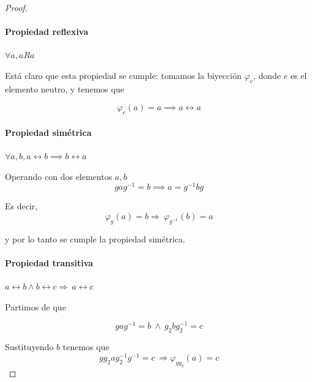 \documentclass[nochap]{apuntes}
\begin{document}
\begin{proof}
 \paragraph{Propiedad reflexiva} $\forall a, aRa$
 
 Está claro que esta propiedad se cumple: tomamos la biyección $φ_{e}$, donde $e$ es el elemento neutro, y tenemos que 
 
 \[ φ_e(a)=a \implies a\rel a\]
 
 \paragraph{Propiedad simétrica} $\forall a,b, a\rel b\implies b\rel a$
 
 Operando con dos elementos $a,b$
    \[ gag^{-1}=b \implies a=g^{-1}bg \]
    
 Es decir, \[ \varphi_{g}(a)=b\Rightarrow \ \varphi_{g^{-1}}(b)=a \]
 
 y por lo tanto se cumple la propiedad simétrica.
 
 \paragraph{Propiedad transitiva} $a\rel b \wedge b\rel c \Rightarrow \ a\rel c$
 
 	Partimos de que
    
    \[ gag^{-1}=b \ \wedge \ g_{2}bg_{2}^{-1}=c\]
    
    Sustituyendo $b$ tenemos que 
    \[ gg_{2}ag_{2}^{-1}g^{-1}=c\ \Rightarrow \varphi_{gg_{2}}(a)=c \]

\end{proof}
\end{document}
